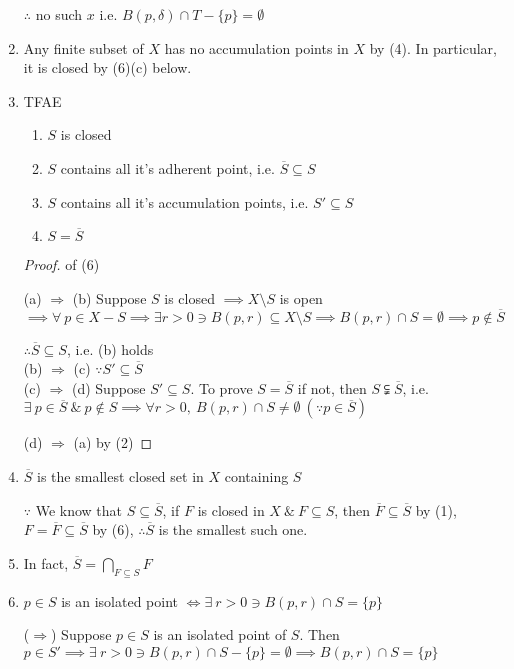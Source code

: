 \begin{enumerate}[wide,label=\textbf{(\arabic*). }]
	$\therefore$ no such $x$ i.e. $B(p,\delta) \cap T - \{p\} = \emptyset$
	\item Any finite subset of $X$ has no accumulation points in $X$ by (4). In particular, it is closed by (6)(c) below.
	\item TFAE
	\begin{enumerate}
		\item $S$ is closed
		\item $S$ contains all it's adherent point, i.e. $\overline{S} \subseteq S$
		\item $S$ contains all it's accumulation points, i.e. $S' \subseteq S$
		\item $S = \overline{S}$
	\end{enumerate}
	\begin{proof} of (6)

(a) $\Rightarrow$ (b) Suppose $S$ is closed $\implies X \setminus S$ is open $\implies \forall ~ p \in X - S \implies \exists r > 0 \ni B(p,r) \subseteq X \setminus S \implies B(p,r) \cap S = \emptyset \implies p \notin \overline{S}$

$\therefore \overline{S} \subseteq S$, i.e. (b) holds\\

(b) $\Rightarrow$ (c) $\because S' \subseteq \overline{S}$\\

(c) $\Rightarrow$ (d) Suppose $S' \subseteq S$. To prove $S = \overline{S}$ if not, then $S \subsetneqq \overline{S}$, i.e. $\exists~ p \in \overline{S} ~\&~ p\notin S \implies \forall r > 0,~B(p,r) \cap S \neq \emptyset~(\because p \in \overline{S})$

(d) $\Rightarrow$ (a) by (2)


\end{proof}

	\item $\overline{S}$ is the smallest closed set in $X$ containing $S$
	
	$\because$ We know that $S \subseteq \overline{S}$, if $F$ is closed in $X ~\&~ F \subseteq S$, then $\overline{F} \subseteq \overline{S}$ by (1), $F = \overline{F} \subseteq \overline{S}$ by (6), $\therefore \overline{S}$ is the smallest such one.
	\item In fact, $\overline{S} = \bigcap_{F \subseteq S}F$
	\item $p \in S$ is an isolated point $\Leftrightarrow \exists~ r > 0 \ni B(p,r) \cap S = \{p\}$
	
	($\Rightarrow$) Suppose $p \in S$ is an isolated point of $S$. Then $p \in S' \implies \exists~ r > 0 \ni B(p,r) \cap S - \{p\} = \emptyset \implies B(p,r) \cap S = \{p\}$
	

\end{enumerate}
